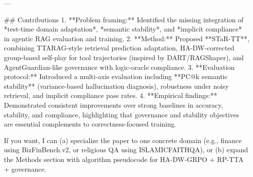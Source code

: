 ---

## Contributions  
1. **Problem framing:** Identified the missing integration of *test-time domain adaptation*, *semantic stability*, and *implicit compliance* in agentic RAG evaluation and training.  
2. **Method:** Proposed **STaR-TT**, combining TTARAG-style retrieval prediction adaptation, HA-DW-corrected group-based self-play for tool trajectories (inspired by DART/RAGShaper), and AgentGuardian-like governance with logic-oracle compliance.  
3. **Evaluation protocol:** Introduced a multi-axis evaluation including **PC@k semantic stability** (variance-based hallucination diagnosis), robustness under noisy retrieval, and implicit compliance pass rates.  
4. **Empirical findings:** Demonstrated consistent improvements over strong baselines in accuracy, stability, and compliance, highlighting that governance and stability objectives are essential complements to correctness-focused training.

If you want, I can (a) specialize the paper to one concrete domain (e.g., finance using BizFinBench.v2, or religious QA using ISLAMICFAITHQA), or (b) expand the Methods section with algorithm pseudocode for HA-DW-GRPO + RP-TTA + governance.